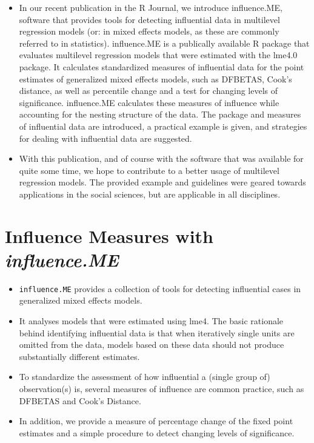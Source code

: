 \documentclass[12pt, a4paper]{article}
\begin{document}
\begin{itemize}
	\item In our recent publication in the R Journal, we introduce influence.ME, software that provides tools for detecting influential data in multilevel regression models (or: in mixed effects models, as these are commonly referred to in statistics). influence.ME is a publically available R package that evaluates multilevel regression models that were estimated with the lme4.0 package. It calculates standardized measures of influential data for the point estimates of generalized mixed effects models, such as DFBETAS, Cook’s distance, as well as percentile change and a test for changing levels of significance. influence.ME calculates these measures of influence while accounting for the nesting structure of the data. The package and measures of influential data are introduced, a practical example is given, and strategies for dealing with influential data are suggested.
	
	\item With this publication, and of course with the software that was available for quite some time, we hope to contribute to a better usage of multilevel regression models. The provided example and guidelines were geared towards applications in the social sciences, but are applicable in all disciplines.
\end{itemize}
\section{Influence Measures with \textit{influence.ME}}

\begin{itemize}
\item \texttt{influence.ME} provides a collection of tools for
detecting influential cases in generalized mixed effects
models. 

\item It analyses models that were estimated using lme4. The
basic rationale behind identifying influential data is that
when iteratively single units are omitted from the data, models
based on these data should not produce substantially different
estimates. 

\item To standardize the assessment of how influential a
(single group of) observation(s) is, several measures of
influence are common practice, such as DFBETAS and Cook's Distance.

\item In addition, we provide a measure of percentage change of the fixed point
estimates and a simple procedure to detect changing levels of significance.
\end{itemize}
\end{document}
